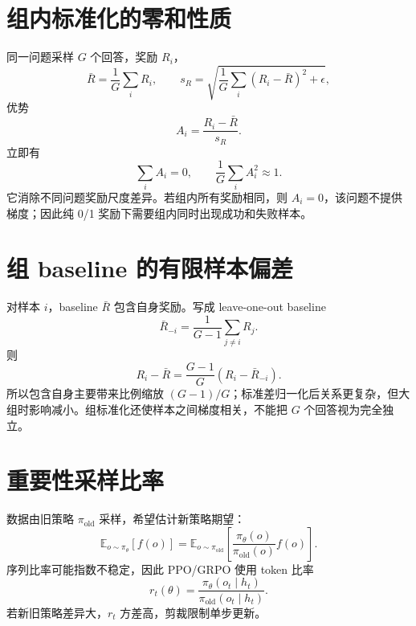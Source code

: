 \documentclass[UTF8,12pt,a4paper,fontset=none]{ctexart}
\numberwithin{equation}{section}
\newcommand{\E}{\mathbb{E}}
\begin{document}
\section{组内标准化的零和性质}
同一问题采样 $G$ 个回答，奖励 $R_i$，
\begin{equation}
 \bar R=\frac1G\sum_iR_i,
 \qquad
 s_R=\sqrt{\frac1G\sum_i(R_i-\bar R)^2+\epsilon},
\end{equation}
优势
\begin{equation}
 A_i=\frac{R_i-\bar R}{s_R}.
\end{equation}
立即有
\begin{equation}
 \sum_iA_i=0,
 \qquad
 \frac1G\sum_iA_i^2\approx1.
\end{equation}
它消除不同问题奖励尺度差异。若组内所有奖励相同，则 $A_i=0$，该问题不提供梯度；因此纯 0/1 奖励下需要组内同时出现成功和失败样本。

\section{组 baseline 的有限样本偏差}
对样本 $i$，baseline $\bar R$ 包含自身奖励。写成 leave-one-out baseline
\begin{equation}
 \bar R_{-i}=\frac1{G-1}\sum_{j\ne i}R_j.
\end{equation}
则
\begin{equation}
 R_i-\bar R=\frac{G-1}{G}(R_i-\bar R_{-i}).
\end{equation}
所以包含自身主要带来比例缩放 $(G-1)/G$；标准差归一化后关系更复杂，但大组时影响减小。组标准化还使样本之间梯度相关，不能把 $G$ 个回答视为完全独立。

\section{重要性采样比率}
数据由旧策略 $\pi_{\mathrm{old}}$ 采样，希望估计新策略期望：
\begin{equation}
 \E_{o\sim\pi_\theta}[f(o)]
 =\E_{o\sim\pi_{\mathrm{old}}}
 \left[\frac{\pi_\theta(o)}{\pi_{\mathrm{old}}(o)}f(o)\right].
\end{equation}
序列比率可能指数不稳定，因此 PPO/GRPO 使用 token 比率
\begin{equation}
 r_t(\theta)=
 \frac{\pi_\theta(o_t\mid h_t)}
 {\pi_{\mathrm{old}}(o_t\mid h_t)}.
\end{equation}
若新旧策略差异大，$r_t$ 方差高，剪裁限制单步更新。
\end{document}
